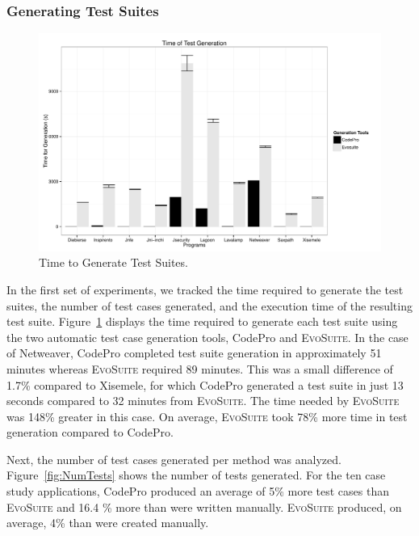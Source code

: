 \subsubsection{Generating Test Suites }
\begin{figure}[!t]
\centering
  \includegraphics[width=\linewidth]{RGraphs/TimeOfGeneration.pdf}
    \caption{Time to Generate Test Suites.}
  \label{fig:TimeGen}
\end{figure}
In the first set of experiments, we tracked the time required to generate the test suites, the number of test cases generated, and the execution time of the resulting test suite.  Figure~\ref{fig:TimeGen} displays the time required to generate each test suite using the two automatic test case generation tools, CodePro and \textsc{EvoSuite}.  In the case of Netweaver, CodePro completed test suite generation in approximately 51 minutes whereas \textsc{EvoSuite} required 89 minutes.  This was a small difference of 1.7\% compared to Xisemele, for which CodePro generated a test suite in just 13 seconds compared to 32 minutes from \textsc{EvoSuite}.  The time needed by \textsc{EvoSuite} was 148\% greater in this case.  On average, \textsc{EvoSuite} took 78\% more time in test generation compared to CodePro.

Next, the number of test cases generated per method was analyzed.  Figure~\ref{fig:NumTests} shows the number of tests generated.  For the ten case study applications, CodePro produced an average of  5\% more test cases than \textsc{EvoSuite} and 16.4 \% more than were written manually.  \textsc{EvoSuite} produced, on average, 4\% than were created manually. 

